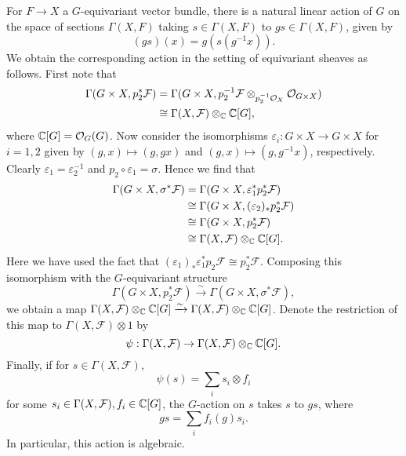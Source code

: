 For $F\to X$ a $G$-equivariant vector bundle, there is a natural linear action of $G$ on the space of
sections $\Gamma(X,F)$ taking $s\in\Gamma(X,F)$ to $gs\in\Gamma(X,F)$, given by
\[(gs)(x) = g(s(g^{-1}x)).\]
We obtain the corresponding action in the setting of equivariant sheaves as follows. First
note that
\begin{align*}
    \Gamma(G\times X,p_2^*\mathcal{F}) &= \Gamma(G\times X, p_2^{-1}\mathcal{F}\otimes_{p_2^{-1}\mathcal{O}_X}\mathcal{O}_{G\times X})\\
    &\cong \Gamma(X,\mathcal{F}) \otimes_{\mathbb{C}}\mathbb{C}[G],
\end{align*}
where $\mathbb{C}[G]=\mathcal{O}_G(G)$. Now consider the isomorphisms
$\varepsilon_i:G\times X\to G\times X$ for $i=1,2$ given by $(g,x)\mapsto (g,gx)$ and $(g,x)\mapsto(g,g^{-1}x)$, respectively.
Clearly $\varepsilon_1=\varepsilon_2^{-1}$ and $p_2\circ\varepsilon_1=\sigma$. Hence we find that
\begin{align*}
    \Gamma(G\times X,\sigma^*\mathcal{F}) &= \Gamma(G\times X,\varepsilon_1^*p_2^*\mathcal{F})\\
    &\cong \Gamma(G\times X,(\varepsilon_2)_*p_2^*\mathcal{F})\\
    &\cong \Gamma(G\times X,p_2^*\mathcal{F})\\
    &\cong \Gamma(X,\mathcal{F}) \otimes_{\mathbb{C}}\mathbb{C}[G].
\end{align*}
Here we have used the fact that $(\varepsilon_1)_*\varepsilon_1^*p_2\mathcal{F}\cong p_2^*\mathcal{F}$.
Composing this isomorphism with the $G$-equivariant structure
\[\Gamma(G\times X,p_2^*\mathcal{F})\xrightarrow{\sim}\Gamma(G\times X,\sigma^*\mathcal{F}),\]
we obtain a map $\Gamma(X,\mathcal{F})\otimes_{\mathbb{C}}\mathbb{C}[G]\xrightarrow{\sim}\Gamma(X,\mathcal{F})\otimes_{\mathbb{C}}\mathbb{C}[G]$.
Denote the restriction of this map to $\Gamma(X,\mathcal{F})\otimes 1$ by
\[\psi:\Gamma(X,\mathcal{F})\to\Gamma(X,\mathcal{F})\otimes_{\mathbb{C}}\mathbb{C}[G].\]
Finally, if for $s\in\Gamma(X,\mathcal{F})$,
\[\psi(s)=\sum_i s_i\otimes f_i\]
for some $s_i\in\Gamma(X,\mathcal{F}), f_i\in\mathbb{C}[G]$, the $G$-action on $s$ takes $s$ to $gs$,
where
\[gs=\sum_if_i(g)s_i.\]
In particular, this action is algebraic.


